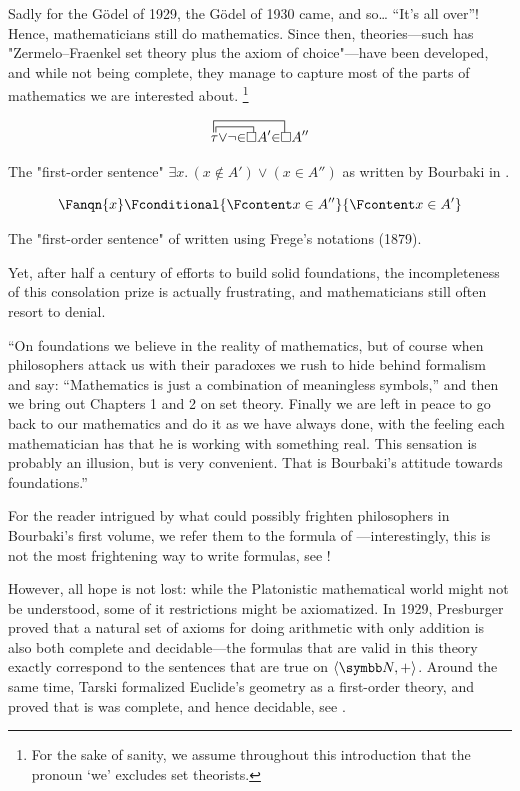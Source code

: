 Sadly for the Gödel of 1929, the Gödel of 1930 came, and so… ``It's all over''!
Hence, mathematicians still do mathematics. Since then, theories---such has
"Zermelo–Fraenkel set theory plus the axiom of choice"---have been developed, and while not being complete, they 
manage to capture most of the parts of mathematics we are interested about.%
\footnote{For the sake of sanity, we assume
throughout this introduction that the pronoun `we' excludes set theorists.}
\begin{marginfigure}
	\centering
	\[
	\contraction{}{\tau\,}{{\vee} {\neg} {\in}}{\!\square}
	\contraction[2ex]{}{\tau\!}{{\vee} {\neg} {\in} \square A' {\in}}{\square}
	\tau {\vee} {\neg} {\in} \square A' {\in} \square A''
	\]
	\caption{\AP\label{fig:intro-bourbaki}
	The "first-order sentence" $\exists x.\, (x \not\in A') \lor (x \in A'')$
	as written by Bourbaki in \cite[\S~1]{Bourbaki2006Logique}.
	}
\end{marginfigure}
\begin{marginfigure}
	\centering
	\[
		\Fanqn{x}\Fconditional{\Fcontent x \in A''}{\Fcontent x \in A'}
	\]
	\caption{\AP\label{fig:intro-frege}
		The "first-order sentence" of 
		written using Frege's notations (1879).
	}
\end{marginfigure}
Yet, after half a century of efforts to build solid foundations,
the incompleteness of this consolation prize is actually frustrating,
and mathematicians still often resort to denial.
\begin{displayquote}
	``On foundations we believe in the reality of mathematics, but of course when philosophers attack us with their paradoxes we rush to hide behind formalism and say: ``Mathematics is just a combination of meaningless symbols,'' and then we bring out Chapters 1 and 2 on set theory. Finally we are left in peace to go back to our mathematics and do it as we have always done, with the feeling each mathematician has that he is working with something real.
	This sensation is probably an illusion, but is very convenient. That is Bourbaki's attitude towards foundations.''
\end{displayquote}
For the reader intrigued by what could possibly frighten philosophers in Bourbaki's first volume,
we refer them to the formula of ---interestingly, this is not the most 
frightening way to write formulas, see !

However, all hope is not lost: while the Platonistic mathematical world might
not be understood, some of it restrictions might be axiomatized.
In 1929, Presburger proved that a natural set of axioms for doing
arithmetic with only addition is also both complete and decidable---the formulas
that are valid in this theory exactly correspond to the sentences that are true on $\tup{\N,+}$.
Around the same time, Tarski formalized Euclide's geometry as a first-order theory, and proved
that is was complete, and hence decidable, see \cite{TarskiGivant1999Geometry}.

